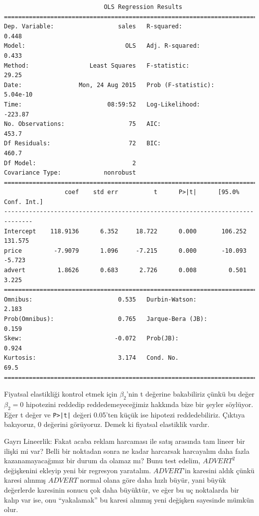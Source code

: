 \documentclass[12pt,fleqn]{article}\usepackage{../../common}
\begin{document}
\begin{verbatim}
                            OLS Regression Results                            
==============================================================================
Dep. Variable:                  sales   R-squared:                       0.448
Model:                            OLS   Adj. R-squared:                  0.433
Method:                 Least Squares   F-statistic:                     29.25
Date:                Mon, 24 Aug 2015   Prob (F-statistic):           5.04e-10
Time:                        08:59:52   Log-Likelihood:                -223.87
No. Observations:                  75   AIC:                             453.7
Df Residuals:                      72   BIC:                             460.7
Df Model:                           2                                         
Covariance Type:            nonrobust                                         
==============================================================================
                 coef    std err          t      P>|t|      [95.0% Conf. Int.]
------------------------------------------------------------------------------
Intercept    118.9136      6.352     18.722      0.000       106.252   131.575
price         -7.9079      1.096     -7.215      0.000       -10.093    -5.723
advert         1.8626      0.683      2.726      0.008         0.501     3.225
==============================================================================
Omnibus:                        0.535   Durbin-Watson:                   2.183
Prob(Omnibus):                  0.765   Jarque-Bera (JB):                0.159
Skew:                          -0.072   Prob(JB):                        0.924
Kurtosis:                       3.174   Cond. No.                         69.5
==============================================================================
\end{verbatim}

Fiyatsal elastikliği kontrol etmek için $\beta_2$'nin t değerine
bakabiliriz çünkü bu değer $\beta_2=0$ hipotezini reddedip
reddedemeyeceğimiz hakkında bize bir şeyler söylüyor. Eğer t değer ve
\verb!P>|t|! değeri 0.05'ten küçük ise hipotezi reddedebiliriz. Çıktıya
bakıyoruz, 0 değerini görüyoruz. Demek ki fiyatsal elastiklik vardır. 

Gayrı Lineerlik: Fakat acaba reklam harcaması ile satış arasında tam lineer
bir ilişki mi var? Belli bir noktadan sonra ne kadar harcarsak harcayalım
daha fazla kazanamayacağımız bir durum da olamaz mı? Bunu test edelim,
$ADVERT^2$ değişkenini ekleyip yeni bir regresyon yaratalım. $ADVERT$'in
karesini aldık çünkü karesi alınmış $ADVERT$ normal olana göre daha hızlı
büyür, yani büyük değerlerde karesinin sonucu çok daha büyüktür, ve eğer bu
uç noktalarda bir kalıp var ise, onu ``yakalamak'' bu karesi alınmış yeni
değişken sayesinde mümkün olur.
\end{document}
